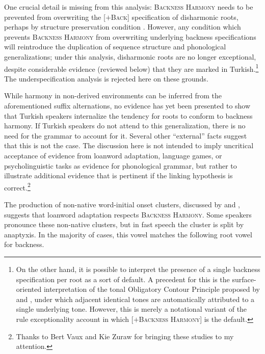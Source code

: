One crucial detail is missing from this analysis: \textsc{Backness Harmony} needs to be prevented from overwriting the [$+$\textsc{Back}] specification of disharmonic roots, perhaps by structure preservation condition \citep{Kiparsky1985}. 
However, any condition which prevents \textsc{Backness Harmony} from overwriting underlying backness specifications will reintroduce the duplication of sequence structure and phonological generalizations; under this analysis, disharmonic roots are no longer exceptional, despite considerable evidence (reviewed below) that they are marked in Turkish.\footnote{
    On the other hand, it is possible to interpret the presence of a single backness specification per root as a sort of default. 
    A precedent for this is the surface-oriented interpretation of the tonal Obligatory Contour Principle proposed by \citet[134]{Goldsmith1976} and \citet{Odden1986}, under which adjacent identical tones are automatically attributed to a single underlying tone. 
    However, this is merely a notational variant of the rule exceptionality account in which [$+$\textsc{Backness Harmony}] is the default.} 
    The underspecification analysis is rejected here on these grounds.

While harmony in non-derived environments can be inferred from the aforementioned suffix alternations, no evidence has yet been presented to show that Turkish speakers internalize the tendency for roots to conform to backness harmony. 
    If Turkish speakers do not attend to this generalization, there is no need for the grammar to account for it. Several other ``external'' facts suggest that this is not the case. 
    The discussion here is not intended to imply uncritical acceptance of evidence from loanword adaptation, language games, or psycholinguistic tasks as evidence for phonological grammar, but rather to illustrate additional evidence that is pertinent if the linking hypothesis is correct.\footnote{
    Thanks to Bert Vaux and Kie Zuraw for bringing these studies to my attention.}

The production of non-native word-initial onset clusters, discussed by \citet{Clements1982} and \citet{Kaun1999}, suggests that loanword adaptation respects \textsc{Backness Harmony}. 
    Some speakers pronounce these non-native clusters, but in fast speech the cluster is split by anaptyxis. 
    In the majority of cases, this vowel matches the following root vowel for backness.

